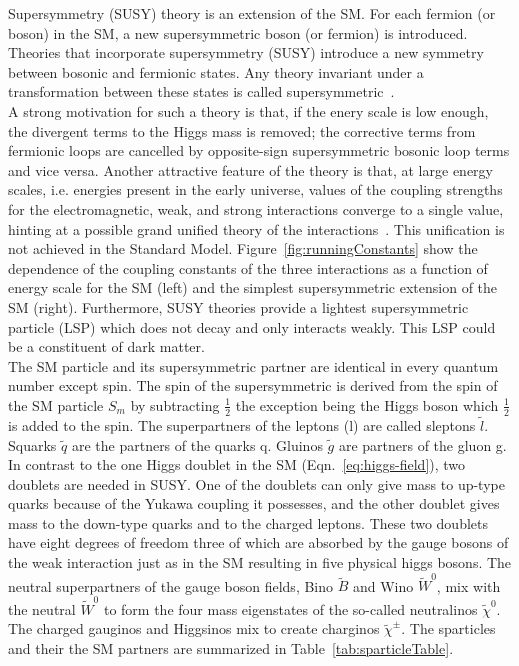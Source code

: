 Supersymmetry (SUSY) theory is an extension of the SM. For each fermion (or boson) in
the SM, a new supersymmetric boson (or fermion) is introduced. Theories that incorporate 
supersymmetry (SUSY) introduce a new symmetry between bosonic and fermionic states. 
Any theory invariant under a transformation between these states is called 
supersymmetric~\cite{ramond1999journeys}.\\
\indent A strong motivation for such a theory is that, if the enery scale is low enough, the 
divergent terms to the Higgs mass is removed; the corrective terms from fermionic loops are cancelled by 
opposite-sign supersymmetric bosonic loop terms and vice versa. Another attractive feature
of the theory is that, at large energy scales, i.e. energies present in the early universe, 
values of the coupling strengths for the electromagnetic, weak, and strong interactions converge 
to a single value, hinting at a possible grand unified theory of the interactions~\cite{wess1992supersymmetry}. 
This unification is not achieved in the Standard Model. Figure~\ref{fig:runningConstants} show the 
dependence of the coupling constants of the three interactions as a function of energy scale 
for the SM (left) and the simplest supersymmetric extension of the SM (right). Furthermore,
SUSY theories provide a lightest supersymmetric particle (LSP) which does not decay and only 
interacts weakly. This LSP could be a constituent of dark matter.\\
\indent The SM particle and its supersymmetric partner are identical in every quantum number except spin. 
The spin of the supersymmetric is derived from the spin of the SM particle $S_{m}$ by 
subtracting $\frac{1}{2}$ the exception being the Higgs boson which $\frac{1}{2}$ is added
to the spin. The superpartners of the leptons (l) are called sleptons $\tilde{l}$. 
Squarks $\tilde{q}$ are the partners of the quarks q. Gluinos $\tilde{g}$ are partners
of the gluon g. In contrast to the one Higgs doublet in the SM (Eqn.~\ref{eq:higgs-field}), 
two doublets are needed in SUSY. One of the doublets can only give mass to up-type quarks because of
the Yukawa coupling it possesses, and the other doublet gives mass to the down-type 
quarks and to the charged leptons. These two doublets have eight degrees of
freedom three of which are absorbed by the gauge bosons of the weak interaction
just as in the SM resulting in five physical higgs bosons.
The neutral superpartners of the gauge boson fields, Bino $\widetilde{B}$ and Wino $\widetilde{W}^0$, mix
with the neutral $\widetilde{W}^0$ to form the four mass eigenstates of the so-called neutralinos 
$\widetilde{\chi}^0$. The charged gauginos and Higgsinos mix to create charginos $\widetilde{\chi}^{\pm}$.
The sparticles and their the SM partners are summarized in Table~\ref{tab:sparticleTable}.


